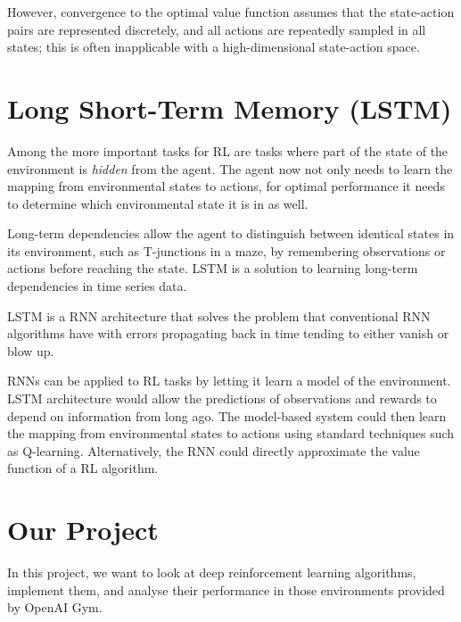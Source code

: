 \documentclass{article}
\begin{document}
However, convergence to the optimal value function assumes that the state-action pairs are represented discretely, and all actions are repeatedly sampled in all states; this is often inapplicable with a high-dimensional state-action space.

\section{Long Short-Term Memory (LSTM) \cite{RLLSTM}}

Among the more important tasks for RL are tasks where part of the state of the environment is \textit{hidden} from the agent. The agent now not only needs to learn the mapping from environmental states to actions, for optimal performance it needs to determine which environmental state it is in as well.

Long-term dependencies allow the agent to distinguish between identical states in its environment, such as T-junctions in a maze, by remembering observations or actions before reaching the state. LSTM is a solution to learning long-term dependencies in time series data.

LSTM is a RNN architecture that solves the problem that conventional RNN algorithms have with errors propagating back in time tending to either vanish or blow up.

RNNs can be applied to RL tasks by letting it learn a model of the environment. LSTM architecture would allow the predictions of observations and rewards to depend on information from long ago. The model-based system could then learn the mapping from environmental states to actions using standard techniques such as Q-learning. Alternatively, the RNN could directly approximate the value function of a RL algorithm.

\section{Our Project}

In this project, we want to look at deep reinforcement learning algorithms, implement them, and analyse their performance in those environments provided by OpenAI Gym.

\printbibliography
\end{document}
